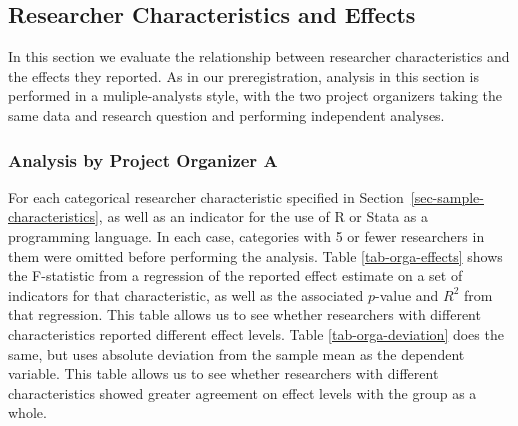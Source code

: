 \documentclass[
  letterpaper,
  DIV=11,
  numbers=noendperiod]{scrartcl}
\begin{document}
\hypertarget{sec-researcher-chars}{%
\subsection{Researcher Characteristics and
Effects}\label{sec-researcher-chars}}

In this section we evaluate the relationship between researcher
characteristics and the effects they reported. As in our
preregistration, analysis in this section is performed in a
muliple-analysts style, with the two project organizers taking the same
data and research question and performing independent analyses.

\hypertarget{analysis-by-project-organizer-a}{%
\subsubsection{Analysis by Project Organizer
A}\label{analysis-by-project-organizer-a}}

For each categorical researcher characteristic specified in
Section~\ref{sec-sample-characteristics}, as well as an indicator for
the use of R or Stata as a programming language. In each case,
categories with 5 or fewer researchers in them were omitted before
performing the analysis. Table \ref{tab-orga-effects} shows the
F-statistic from a regression of the reported effect estimate on a set
of indicators for that characteristic, as well as the associated
\(p\)-value and \(R^2\) from that regression. This table allows us to
see whether researchers with different characteristics reported
different effect levels. Table \ref{tab-orga-deviation} does the same,
but uses absolute deviation from the sample mean as the dependent
variable. This table allows us to see whether researchers with different
characteristics showed greater agreement on effect levels with the group
as a whole.
\end{document}

